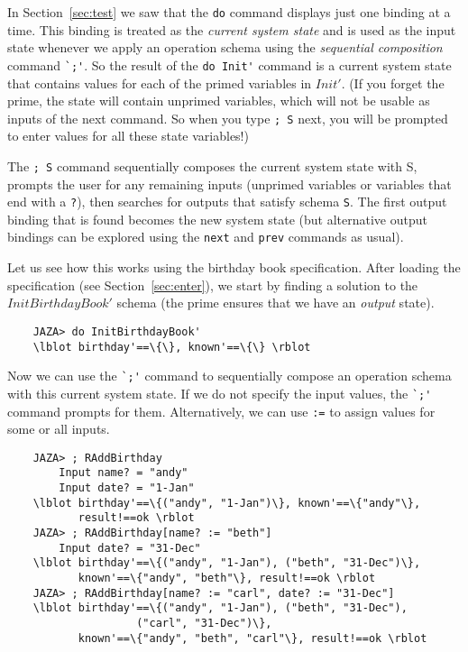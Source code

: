 \documentclass[11pt]{article}
\begin{document}
In Section~\ref{sec:test} we saw that the \verb!do! command displays
just one binding at a time.  This binding is treated as the 
\emph{current system state} and is used as the input state whenever
we apply an operation schema using the \emph{sequential composition}
command \verb!`;'!.  So the result of the \verb!do Init'! command
is a current system state that contains values for each of the
primed variables in $Init'$.  (If you forget the prime, the state will
contain unprimed variables, which will not be usable as inputs of
the next command.  So when you type \verb!; S! next, you will be 
prompted to enter values for all these state variables!)

The \verb!; S! command sequentially composes the current system state
with S, prompts the user for any remaining inputs (unprimed variables or
variables that end with a \verb!?!), then searches for outputs that
satisfy schema \verb!S!.  The first output binding that is found
becomes the new system state (but alternative output bindings can
be explored using the \verb!next! and \verb!prev! commands as usual).

Let us see how this works using the birthday book specification.
After loading the specification (see Section~\ref{sec:enter}),
we start by finding a solution to the $InitBirthdayBook'$ schema
(the prime ensures that we have an \emph{output} state).
\begin{verbatim}
    JAZA> do InitBirthdayBook'
    \lblot birthday'==\{\}, known'==\{\} \rblot
\end{verbatim}

Now we can use the \verb!`;'! command to sequentially compose
an operation schema with this current system state.  If we
do not specify the input values, the \verb!`;'! command prompts
for them.  Alternatively, we can use \verb!:=! to assign values for some
or all inputs. 
\begin{verbatim}
    JAZA> ; RAddBirthday
        Input name? = "andy"
        Input date? = "1-Jan"
    \lblot birthday'==\{("andy", "1-Jan")\}, known'==\{"andy"\},
           result!==ok \rblot
    JAZA> ; RAddBirthday[name? := "beth"]
        Input date? = "31-Dec"
    \lblot birthday'==\{("andy", "1-Jan"), ("beth", "31-Dec")\},
           known'==\{"andy", "beth"\}, result!==ok \rblot
    JAZA> ; RAddBirthday[name? := "carl", date? := "31-Dec"]
    \lblot birthday'==\{("andy", "1-Jan"), ("beth", "31-Dec"),
                    ("carl", "31-Dec")\},
           known'==\{"andy", "beth", "carl"\}, result!==ok \rblot
\end{verbatim}
\end{document}
